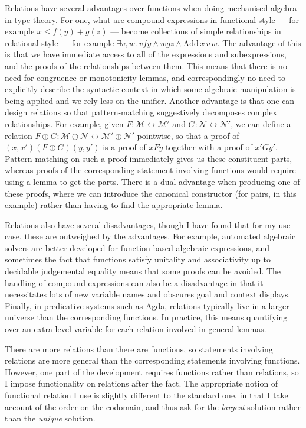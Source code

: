 Relations have several advantages over functions when doing mechanised algebra
in type theory.
For one, what are compound expressions in functional style --- for example
$x \leq f(y) + g(z)$ --- become collections of simple relationships in
relational style --- for example $\exists v,w.~vfy \land wgz \land
\mathrm{Add}\,x\,v\,w$.
The advantage of this is that we have immediate access to all of the expressions
and subexpressions, and the proofs of the relationships between them.
This means that there is no need for congruence or monotonicity lemmas, and
correspondingly no need to explicitly describe the syntactic context in which
some algebraic manipulation is being applied and we rely less on the unifier.
Another advantage is that one can design relations so that pattern-matching
suggestively decomposes complex relationships.
For example, given $F : \mathscr M \rel \mathscr M'$ and
$G : \mathscr N \rel \mathscr N'$, we can define a relation
$F \oplus G : \mathscr M \oplus \mathscr N \rel \mathscr M' \oplus \mathscr N'$
pointwise, so that a proof of $(x, x')(F \oplus G)(y, y')$ is a proof of $xFy$
together with a proof of $x'Gy'$.
Pattern-matching on such a proof immediately gives us these constituent parts,
whereas proofs of the corresponding statement involving functions would require
using a lemma to get the parts.
There is a dual advantage when producing one of these proofs, where we can
introduce the canonical constructor (for pairs, in this example) rather than
having to find the appropriate lemma.

Relations also have several disadvantages, though I have found that for my use
case, these are outweighed by the advantages.
For example, automated algebraic solvers are better developed for function-based
algebraic expressions, and sometimes the fact that functions satisfy unitality
and associativity up to decidable judgemental equality means that some proofs
can be avoided.
The handling of compound expressions can also be a disadvantage in that it
necessitates lots of new variable names and obscures goal and context displays.
Finally, in predicative systems such as Agda, relations typically live in a
larger universe than the corresponding functions.
In practice, this means quantifying over an extra level variable for each
relation involved in general lemmas.

There are more relations than there are functions, so statements involving
relations are more general than the corresponding statements involving
functions.
However, one part of the development requires functions rather than relations,
so I impose functionality on relations after the fact.
The appropriate notion of functional relation I use is slightly different to the
standard one, in that I take account of the order on the codomain, and thus ask
for the \emph{largest} solution rather than the \emph{unique} solution.

